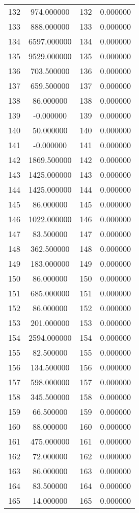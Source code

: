 \documentclass[12pt]{article}
\begin{document}
\begin{longtable}{@{}cccc@{}}
132 & 974.000000 & 132 & 0.000000 \\
133 & 888.000000 & 133 & 0.000000 \\
134 & 6597.000000 & 134 & 0.000000 \\
135 & 9529.000000 & 135 & 0.000000 \\
136 & 703.500000 & 136 & 0.000000 \\
137 & 659.500000 & 137 & 0.000000 \\
138 & 86.000000 & 138 & 0.000000 \\
139 & -0.000000 & 139 & 0.000000 \\
140 & 50.000000 & 140 & 0.000000 \\
141 & -0.000000 & 141 & 0.000000 \\
142 & 1869.500000 & 142 & 0.000000 \\
143 & 1425.000000 & 143 & 0.000000 \\
144 & 1425.000000 & 144 & 0.000000 \\
145 & 86.000000 & 145 & 0.000000 \\
146 & 1022.000000 & 146 & 0.000000 \\
147 & 83.500000 & 147 & 0.000000 \\
148 & 362.500000 & 148 & 0.000000 \\
149 & 183.000000 & 149 & 0.000000 \\
150 & 86.000000 & 150 & 0.000000 \\
151 & 685.000000 & 151 & 0.000000 \\
152 & 86.000000 & 152 & 0.000000 \\
153 & 201.000000 & 153 & 0.000000 \\
154 & 2594.000000 & 154 & 0.000000 \\
155 & 82.500000 & 155 & 0.000000 \\
156 & 134.500000 & 156 & 0.000000 \\
157 & 598.000000 & 157 & 0.000000 \\
158 & 345.500000 & 158 & 0.000000 \\
159 & 66.500000 & 159 & 0.000000 \\
160 & 88.000000 & 160 & 0.000000 \\
161 & 475.000000 & 161 & 0.000000 \\
162 & 72.000000 & 162 & 0.000000 \\
163 & 86.000000 & 163 & 0.000000 \\
164 & 83.500000 & 164 & 0.000000 \\
165 & 14.000000 & 165 & 0.000000 \\

\end{longtable}
\end{document}
